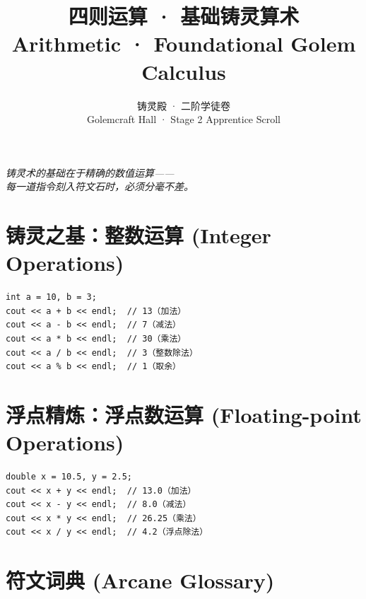 \documentclass[UTF8,a4paper,12pt]{ctexart}
\title{四则运算 · 基础铸灵算术\\[4pt]
\large Arithmetic · Foundational Golem Calculus}
\author{铸灵殿 · 二阶学徒卷\\[2pt]
\small Golemcraft Hall · Stage 2 Apprentice Scroll}
\date{}
\begin{document}
\maketitle

\begin{center}
\textit{铸灵术的基础在于精确的数值运算——\\
每一道指令刻入符文石时，必须分毫不差。}
\end{center}

\vspace{0.5em}

\section*{铸灵之基：整数运算 (Integer Operations)}

\begin{lstlisting}
int a = 10, b = 3;
cout << a + b << endl;  // 13（加法）
cout << a - b << endl;  // 7（减法）
cout << a * b << endl;  // 30（乘法）
cout << a / b << endl;  // 3（整数除法）
cout << a % b << endl;  // 1（取余）
\end{lstlisting}

\section*{浮点精炼：浮点数运算 (Floating-point Operations)}

\begin{lstlisting}
double x = 10.5, y = 2.5;
cout << x + y << endl;  // 13.0（加法）
cout << x - y << endl;  // 8.0（减法）
cout << x * y << endl;  // 26.25（乘法）
cout << x / y << endl;  // 4.2（浮点除法）
\end{lstlisting}

\section*{符文词典 (Arcane Glossary)}
\end{document}
